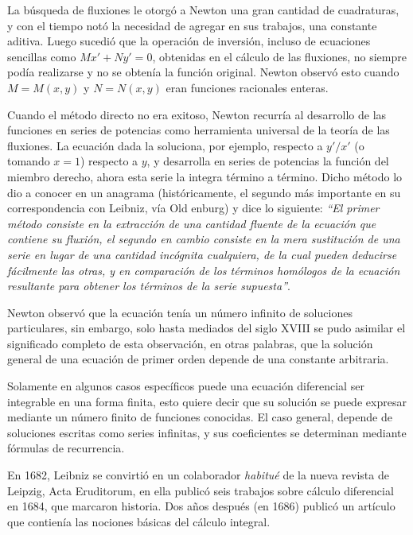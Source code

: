 \documentclass[12pt,a4paper,oneside]{book}
\begin{document}
	\medskip
	\noindent
	La búsqueda de fluxiones le otorgó a Newton una gran cantidad de cuadraturas, y con el tiempo notó la necesidad de agregar en sus trabajos, una constante aditiva. Luego sucedió que la operación de inversión, incluso de ecuaciones sencillas como $Mx'+Ny'=0$, obtenidas en el cálculo de las fluxiones, no siempre podía realizarse y no se obtenía la función original. Newton observó esto cuando $M=M(x,y)$ y $N= N(x,y)$ eran funciones racionales enteras.
	
	\medskip
	\noindent
	Cuando el método directo no era exitoso, Newton recurría al desarrollo de las funciones en series de potencias como herramienta universal
	de la teoría de las fluxiones. La ecuación dada la soluciona, por ejemplo, respecto a $y'/x'$ (o tomando $x=1$) respecto a $y$, y desarrolla en series de potencias la función del miembro derecho, ahora esta serie la integra término a término. Dicho método lo dio a conocer en un anagrama (históricamente, el segundo más importante en su correspondencia con Leibniz, vía Old enburg) y dice lo siguiente: \textit{\textquotedblleft El primer método consiste en la extracción de una cantidad fluente de la ecuación que contiene su fluxión, el segundo en cambio consiste en la mera sustitución de una serie en lugar de una cantidad incógnita cualquiera, de la cual pueden deducirse fácilmente las otras, y en comparación de los términos homólogos de la ecuación resultante para obtener los términos de la serie supuesta\textquotedblright}.
	
	\medskip
	\noindent
	Newton observó que la ecuación tenía un número infinito de soluciones particulares, sin embargo, solo hasta mediados del siglo XVIII se pudo asimilar el significado completo
	de esta observación, en otras palabras, que la solución general de una ecuación de primer orden depende de una constante arbitraria.
	
	\medskip
	\noindent
	Solamente en algunos casos específicos puede una ecuación diferencial ser integrable en una forma finita, esto quiere decir que su solución se puede expresar mediante un número finito de funciones conocidas. El caso general, depende de soluciones escritas como series infinitas, y sus coeficientes se determinan mediante fórmulas de recurrencia.
	
	\medskip
	\noindent
	En 1682, Leibniz se convirtió en un colaborador \textit{habitué} de la nueva revista de Leipzig, Acta Eruditorum, en ella publicó seis trabajos sobre cálculo diferencial en 1684, que marcaron historia. Dos años después (en 1686) publicó un artículo que contienía las nociones básicas del cálculo integral.
	
\end{document}
